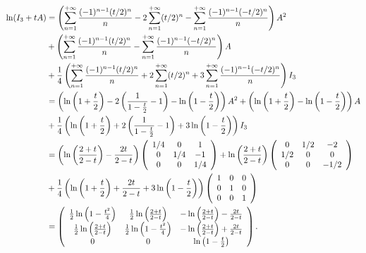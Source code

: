 {{\begin{align*}\ensuremath
\ln(I_3+tA)&=\left(\sum_{n=1}^{+\infty} \frac{(-1)^{n-1}(t/2)^n}{n}-2\sum_{n=1}^{+\infty}(t/2)^n-\sum_{n=1}^{+\infty} \frac{(-1)^{n-1}(-t/2)^n}{n}\right)A^2\\
 &+\left(\sum_{n=1}^{+\infty} \frac{(-1)^{n-1}(t/2)^n}{n}-\sum_{n=1}^{+\infty} \frac{(-1)^{n-1}(-t/2)^n}{n}\right)A\\
  &+ \frac{1}{4}\left(\sum_{n=1}^{+\infty} \frac{(-1)^{n-1}(t/2)^n}{n}+2\sum_{n=1}^{+\infty}(t/2)^n+3\sum_{n=1}^{+\infty} \frac{(-1)^{n-1}(-t/2)^n}{n}\right)I_3\\
  &=\left(\ln\left(1+ \frac{t}{2}\right)-2\left( \frac{1}{1- \frac{t}{2}}-1\right)-\ln\left(1- \frac{t}{2}\right)\right)A^2+\left(\ln\left(1+ \frac{t}{2}\right)-\ln\left(1- \frac{t}{2}\right)\right)A\\
  &+ \frac{1}{4}\left(\ln\left(1+ \frac{t}{2}\right)+2\left( \frac{1}{1- \frac{t}{2}}-1\right)+3\ln\left(1- \frac{t}{2}\right)\right)I_3\\
  &=\left(\ln\left( \frac{2+t}{2-t}\right)- \frac{2t}{2-t}\right)\left(
\begin{array}{ccc}
1/4&0&1\\
0&1/4&-1\\
0&0&1/4
\end{array}
\right)+\ln\left( \frac{2+t}{2-t}\right)\left(
\begin{array}{ccc}
0&1/2&-2\\
1/2&0&0\\
0&0&-1/2
\end{array}
\right)\\
  &+ \frac{1}{4}\left(\ln\left(1+ \frac{t}{2}\right)+ \frac{2t}{2-t}+3\ln\left(1- \frac{t}{2}\right)\right)\left(
\begin{array}{ccc}
1&0&0\\
0&1&0\\
0&0&1
\end{array}
\right)\\
 &=\left(
 \begin{array}{ccc}
 \frac{1}{2}\ln\left(1- \frac{t^2}{4}\right)& \frac{1}{2}\ln\left( \frac{2+t}{2-t}\right)&-\ln\left( \frac{2+t}{2-t}\right)- \frac{2t}{2-t}\\
 \frac{1}{2}\ln\left( \frac{2+t}{2-t}\right)& \frac{1}{2}\ln\left(1- \frac{t^2}{4}\right)&-\ln\left( \frac{2+t}{2-t}\right)+ \frac{2t}{2-t}\\
 0&0&\ln\left(1- \frac{t}{2}\right)
 \end{array}
 \right).
\end{align*}

\begin{center}
\shadowbox{
$\forall t\in]-2,2[$, $\ln(I_3+tA)=\left(
 \begin{array}{ccc}
 \frac{1}{2}\ln\left(1- \frac{t^2}{4}\right)& \frac{1}{2}\ln\left( \frac{2+t}{2-t}\right)&-\ln\left( \frac{2+t}{2-t}\right)- \frac{2t}{2-t}\\
 \frac{1}{2}\ln\left( \frac{2+t}{2-t}\right)& \frac{1}{2}\ln\left(1- \frac{t^2}{4}\right)&-\ln\left( \frac{2+t}{2-t}\right)+ \frac{2t}{2-t}\\
 0&0&\ln\left(1- \frac{t}{2}\right)
 \end{array}
 \right)$.
}
\end{center}}
}